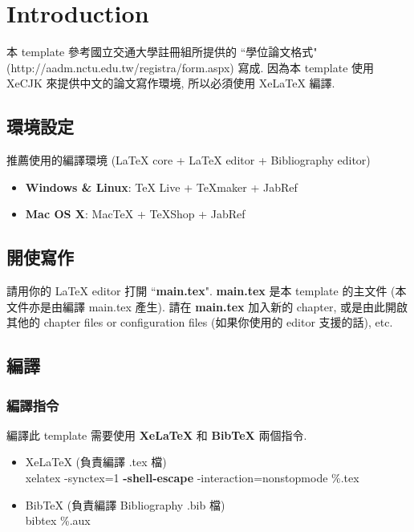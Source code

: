\chapter{Introduction}
\label{chapter:intro}

本 template 參考國立交通大學註冊組所提供的 ``學位論文格式" (http://aadm.nctu.edu.tw/registra/form.aspx) 寫成.
因為本 template 使用 XeCJK 來提供中文的論文寫作環境, 所以必須使用 XeLaTeX 編譯.

\section{環境設定}

推薦使用的編譯環境 (LaTeX core + LaTeX editor + Bibliography editor)

\begin{itemize}
\item \textbf{Windows \& Linux}: TeX Live + TeXmaker + JabRef
\item \textbf{Mac OS X}: MacTeX + TeXShop + JabRef
\end{itemize}

\section{開使寫作}

請用你的 LaTeX editor 打開 ``\textbf{main.tex}".
\textbf{main.tex} 是本 template 的主文件 (本文件亦是由編譯 main.tex 產生).
請在 \textbf{main.tex} 加入新的 chapter, 或是由此開啟其他的 chapter files or configuration files (如果你使用的 editor 支援的話), etc.

\section{編譯}

\subsection{編譯指令}

編譯此 template 需要使用 \textbf{XeLaTeX} 和 \textbf{BibTeX} 兩個指令.

\begin{itemize}
\item XeLaTeX (負責編譯 .tex 檔)\\
xelatex -synctex=1 \textbf{-shell-escape} -interaction=nonstopmode \%.tex
\item BibTeX (負責編譯 Bibliography .bib 檔)\\
bibtex \%.aux
\end{itemize}

